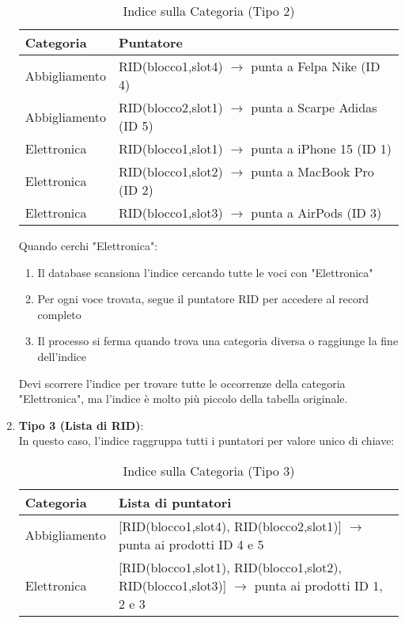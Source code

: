 \begin{enumerate}
    \begin{table}[H]
    \centering
    \begin{tabular}{|l|l|}
    \hline
    \textbf{Categoria} & \textbf{Puntatore} \\
    \hline
    Abbigliamento & RID(blocco1,slot4) $\rightarrow$ punta a Felpa Nike (ID 4) \\
    Abbigliamento & RID(blocco2,slot1) $\rightarrow$ punta a Scarpe Adidas (ID 5) \\
    Elettronica & RID(blocco1,slot1) $\rightarrow$ punta a iPhone 15 (ID 1) \\
    Elettronica & RID(blocco1,slot2) $\rightarrow$ punta a MacBook Pro (ID 2) \\
    Elettronica & RID(blocco1,slot3) $\rightarrow$ punta a AirPods (ID 3) \\
    \hline
    \end{tabular}
    \caption{Indice sulla Categoria (Tipo 2)}
    \end{table}
    
    Quando cerchi "Elettronica":
    \begin{enumerate}
        \item Il database scansiona l'indice cercando tutte le voci con "Elettronica"
        \item Per ogni voce trovata, segue il puntatore RID per accedere al record completo
        \item Il processo si ferma quando trova una categoria diversa o raggiunge la fine dell'indice
    \end{enumerate}
    
    Devi scorrere l'indice per trovare tutte le occorrenze della categoria "Elettronica", ma l'indice è molto più piccolo della tabella originale.
    
    \item \textbf{Tipo 3 (Lista di RID)}:\\
    In questo caso, l'indice raggruppa tutti i puntatori per valore unico di chiave:
    
    \begin{table}[H]
    \centering
    \begin{tabular}{|l|l|}
    \hline
    \textbf{Categoria} & \textbf{Lista di puntatori} \\
    \hline
    Abbigliamento & [RID(blocco1,slot4), RID(blocco2,slot1)] $\rightarrow$ punta ai prodotti ID 4 e 5 \\
    Elettronica & [RID(blocco1,slot1), RID(blocco1,slot2), RID(blocco1,slot3)] $\rightarrow$ punta ai prodotti ID 1, 2 e 3 \\
    \hline
    \end{tabular}
    \caption{Indice sulla Categoria (Tipo 3)}
    \end{table}
    

\end{enumerate}
